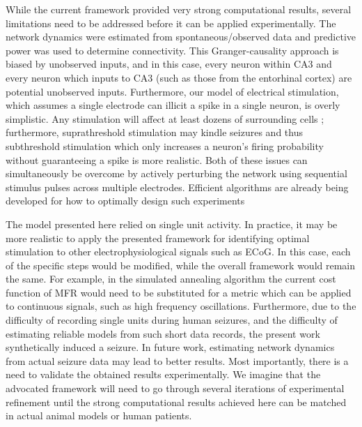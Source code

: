 \documentclass[11pt,a4paper,final]{article}
\begin{document}
While the current framework provided very strong computational results, several limitations need to be addressed before it can be applied experimentally.
The network dynamics were estimated from spontaneous/observed data and predictive power was used to determine connectivity.
This Granger-causality approach is biased by unobserved inputs, and in this case, every neuron within CA3 and every neuron which inputs to CA3 (such as those from the entorhinal cortex) are potential unobserved inputs.
Furthermore, our model of electrical stimulation, which assumes a single electrode can illicit a spike in a single neuron, is overly simplistic.
Any stimulation will affect at least dozens of surrounding cells \citep{grill05,desai14}; furthermore, suprathreshold stimulation may kindle seizures \citep{racine72} and thus subthreshold stimulation which only increases a neuron's firing probability without guaranteeing a spike is more realistic.
Both of these issues can simultaneously be overcome by actively perturbing the network using sequential stimulus pulses across multiple electrodes.
Efficient algorithms are already being developed for how to optimally design such experiments \citep{lepage13,kim14}

The model presented here relied on single unit activity.
In practice, it may be more realistic to apply the presented framework for identifying optimal stimulation to other electrophysiological signals such as ECoG.
In this case, each of the specific steps would be modified, while the overall framework would remain the same.
For example, in the simulated annealing algorithm the current cost function of MFR would need to be substituted for a metric which can be applied to continuous signals, such as high frequency oscillations.
Furthermore, due to the difficulty of recording single units during human seizures, and the difficulty of estimating reliable models from such short data records, the present work synthetically induced a seizure.
In future work, estimating network dynamics from actual seizure data may lead to better results.
Most importantly, there is a need to validate the obtained results experimentally.
We imagine that the advocated framework will need to go through several iterations of experimental refinement until the strong computational results achieved here can be matched in actual animal models or human patients.
\end{document}
